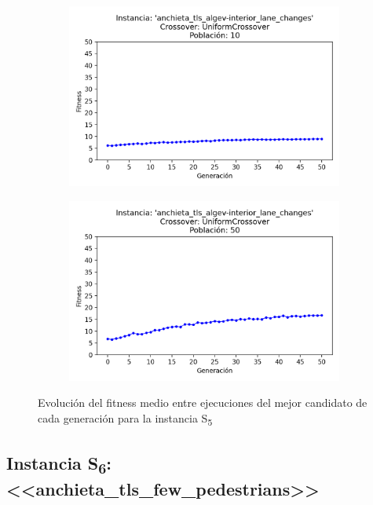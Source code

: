 \begin{figure}[h]
\begin{subfigure}[t]{.49\textwidth}
      \includegraphics[width=\textwidth]{report/images/estudio/anchieta_tls_algev-interior_lane_changes-UniformCrossover-10.png}
    \end{subfigure}
    \hfill
    \begin{subfigure}[t]{.49\textwidth}
      \centering
      \includegraphics[width=\textwidth]{report/images/estudio/anchieta_tls_algev-interior_lane_changes-UniformCrossover-50.png}
    \end{subfigure}
    \caption{Evolución del fitness medio entre ejecuciones del mejor candidato de cada generación para la instancia S\textsubscript{5}}
    \label{fig:estudio:anchieta_tls_interior_lane_changes}
\end{figure}



\subsection{Instancia S\textsubscript{6}: <<anchieta\_tls\_few\_pedestrians>>}

